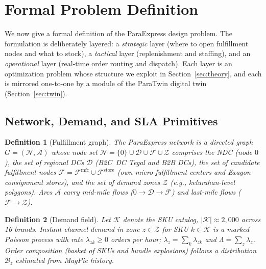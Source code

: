 \documentclass[journal]{IEEEtran}
\newtheorem{definition}{Definition}
\begin{document}
\section{Formal Problem Definition}
\label{sec:model}
We now give a formal definition of the ParaExpress design problem. The formulation is deliberately layered: a \emph{strategic} layer (where to open fulfillment nodes and what to stock), a \emph{tactical} layer (replenishment and staffing), and an \emph{operational} layer (real-time order routing and dispatch). Each layer is an optimization problem whose structure we exploit in Section~\ref{sec:theory}, and each is mirrored one-to-one by a module of the ParaTwin digital twin (Section~\ref{sec:twin}).

\subsection{Network, Demand, and SLA Primitives}

\begin{definition}[Fulfillment graph]
\label{def:graph}
The ParaExpress network is a directed graph $G=(\mathcal{N},\mathcal{A})$ whose node set
$\mathcal{N} = \{0\} \cup \mathcal{D} \cup \mathcal{F} \cup \mathcal{Z}$
comprises the NDC (node $0$), the set of regional DCs $\mathcal{D}$ (B2C~DC Tegal and B2B DCs), the set of \emph{candidate fulfillment nodes} $\mathcal{F} = \mathcal{F}^{\mathrm{mfc}} \cup \mathcal{F}^{\mathrm{store}}$ (own micro-fulfillment centers and Exagon consignment stores), and the set of demand zones $\mathcal{Z}$ (e.g., kelurahan-level polygons). Arcs $\mathcal{A}$ carry mid-mile flows ($0 \to \mathcal{D} \to \mathcal{F}$) and last-mile flows ($\mathcal{F} \to \mathcal{Z}$).
\end{definition}

\begin{definition}[Demand field]
\label{def:demand}
Let $\mathcal{K}$ denote the SKU catalog, $|\mathcal{K}| \approx 2{,}000$ across 16 brands. Instant-channel demand in zone $z \in \mathcal{Z}$ for SKU $k \in \mathcal{K}$ is a marked Poisson process with rate $\lambda_{zk} \geq 0$ orders per hour; $\lambda_z = \sum_k \lambda_{zk}$ and $\Lambda = \sum_z \lambda_z$. Order composition (basket of SKUs and bundle explosions) follows a distribution $\mathcal{B}_z$ estimated from MagPie history.
\end{definition}
\end{document}
